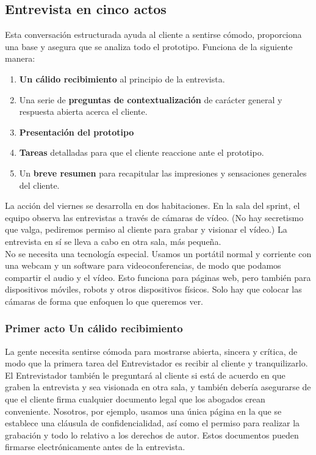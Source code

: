 \documentclass[10pt]{article}
\begin{document}
\begin{multicols}{2}
\subsection*{Entrevista en cinco actos}
Esta conversación estructurada ayuda al cliente a sentirse cómodo, proporciona una base y asegura que se analiza todo el prototipo. Funciona de la siguiente manera:
\begin{enumerate}[\bfseries 1.]
\item \textbf{Un cálido recibimiento} al principio de la entrevista.
\item Una serie de \textbf{preguntas de contextualización} de carácter general y respuesta abierta acerca el cliente.
\item \textbf{Presentación del prototipo}
\item \textbf{Tareas} detalladas para que el cliente reaccione ante el prototipo.
\item Un \textbf{breve resumen} para recapitular las impresiones y sensaciones generales del cliente. 
\end{enumerate}
La acción del viernes se desarrolla en dos habitaciones. En la sala del sprint, el equipo observa las entrevistas a través de cámaras de vídeo. (No hay secretismo que valga, pediremos permiso al cliente para grabar y visionar el vídeo.) La entrevista en sí se lleva a cabo en otra sala, más pequeña.\\
No se necesita una tecnología especial. Usamos un portátil normal y corriente con una webcam y un software para videoconferencias, de modo que podamos compartir el audio y el vídeo. Esto funciona para páginas web, pero también para dispositivos móviles, robots y otros dispositivos físicos. Solo hay que colocar las cámaras de forma que enfoquen lo que queremos ver.
\subsubsection*{Primer acto Un cálido recibimiento}
La gente necesita sentirse cómoda para mostrarse abierta, sincera y crítica, de modo que la primera tarea del Entrevistador es recibir al cliente y tranquilizarlo.\\
El Entrevistador también le preguntará al cliente si está de acuerdo en que graben la entrevista y sea visionada en otra sala, y también debería asegurarse de que el cliente firma cualquier documento legal que los abogados crean conveniente. Nosotros, por ejemplo, usamos una única página en la que se establece una cláusula de confidencialidad, así como el permiso para realizar la grabación y todo lo relativo a los derechos de autor. Estos documentos pueden firmarse electrónicamente antes de la entrevista.

\end{multicols}
\end{document}
